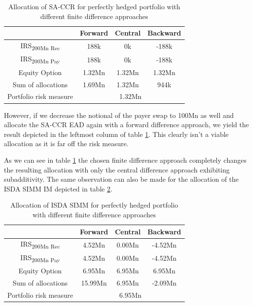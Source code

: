 \documentclass[../Thesis_AHoecherl.tex]{subfiles}
\begin{document}
    \begin{table}[htbp]
        \centering
        \begin{tabular}{c|c|c|c}
            & Forward & Central & Backward \\
            \toprule
            IRS\textsubscript{200Mn Rec} & 188k & 0k & -188k \\
            \midrule
                IRS\textsubscript{200Mn Pay} & 188k & 0k & -188k\\
                \midrule
                Equity Option & 1.32Mn & 1.32Mn & 1.32Mn\\
                \bottomrule
                Sum of allocations & 1.69Mn & 1.32Mn & 944k \\
                \midrule
                Portfolio risk measure & \multicolumn{3}{c}{1.32Mn} \\
            \end{tabular}%
            \caption[Allocation of \gls{SA-CCR} for perfectly hedged portfolio]{Allocation of \gls{SA-CCR} for perfectly hedged portfolio with different finite difference approaches}
            \label{tab:EAD perfect hedge}
    \end{table}

    However, if we decrease the notional of the payer swap to 100Mn as well and allocate the \gls{SA-CCR} \gls{EAD} again with a forward difference approach, we yield the result depicted in the leftmost column of table \ref{tab:EAD perfect hedge}. This clearly isn't a viable allocation as it is far off the risk measure.
    
    As we can see in table \ref{tab:EAD perfect hedge} the chosen finite difference approach completely changes the resulting allocation with only the central difference approach exhibiting subadditivity.
    The same observation can also be made for the allocation of the \gls{ISDA SIMM} \gls{IM} depicted in table \ref{tab:IM perfect hedge}.
    \begin{table}[htbp]
        \centering
        \begin{tabular}{c|c|c|c}
            & Forward & Central & Backward \\
            \toprule
            IRS\textsubscript{200Mn Rec} & 4.52Mn & 0.00Mn & -4.52Mn \\
            \midrule
            IRS\textsubscript{200Mn Pay} & 4.52Mn & 0.00Mn & -4.52Mn \\
            \midrule
            Equity Option & 6.95Mn & 6.95Mn & 6.95Mn \\
            \bottomrule
            Sum of allocations & 15.99Mn & 6.95Mn & -2.09Mn \\
            \midrule
            Portfolio risk measure & \multicolumn{3}{c}{6.95Mn}  \\
        \end{tabular}%
        \caption[Allocation of \gls{ISDA SIMM} for perfectly hedged portfolio]{Allocation of \gls{ISDA SIMM} for perfectly hedged portfolio with different finite difference approaches}
        \label{tab:IM perfect hedge}
    \end{table}
    
\end{document}
